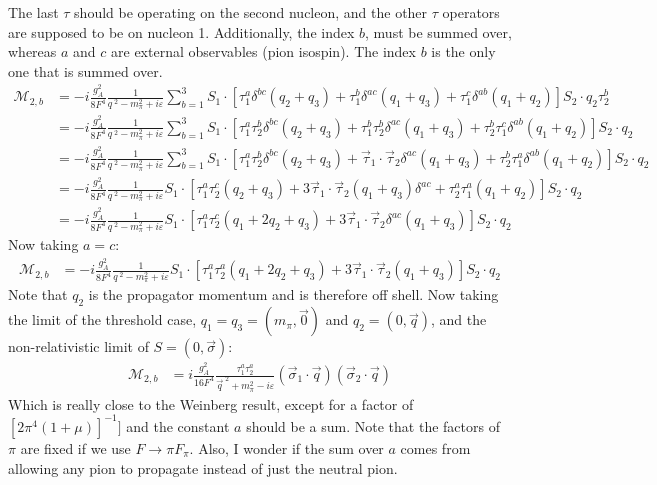 \documentclass[11pt]{article}
\newcommand\mm{\mathcal{M}}
\begin{document}
The last $\tau$ should be operating on the second nucleon, and the other $\tau$ operators are supposed to be on nucleon 1. Additionally, the index $b$, must be summed over, whereas $a$ and $c$ are external observables (pion isospin). The index $b$ is the only one that is summed over.
\begin{align}
\mm_{2,b}&=-i\frac{g_A^2}{8F^4}\frac{1}{q^{\;2}- m_\pi^2 + i \varepsilon} \sum_{b=1}^3 S_1 \cdot \left[ \tau_1^a \delta^{bc} (q_2+q_3) + \tau_1^b \delta^{ac} (q_1+q_3)+ \tau_1^c \delta^{ab} \left(q_1+q_2\right)\right] S_2 \cdot q_2 \tau^b_2\\
               &=-i\frac{g_A^2}{8F^4}\frac{1}{q^{\;2}- m_\pi^2 + i \varepsilon} \sum_{b=1}^3 S_1 \cdot \left[ \tau_1^a\tau_2^b \delta^{bc} (q_2+q_3) + \tau_1^b \tau_2^b\delta^{ac} (q_1+q_3)+ \tau_2^b\tau_1^c \delta^{ab} \left(q_1+q_2\right)\right] S_2 \cdot q_2\label{Correct}\\
               &=-i\frac{g_A^2}{8F^4}\frac{1}{q^{\;2}- m_\pi^2 + i \varepsilon} \sum_{b=1}^3 S_1 \cdot \left[ \tau_1^a\tau_2^b \delta^{bc} (q_2+q_3) + \vec{\tau}_1 \cdot \vec{\tau}_2 \delta^{ac}(q_1+q_3)+ \tau_2^b\tau_1^a \delta^{ab} \left(q_1+q_2\right)\right] S_2 \cdot q_2\\
    &=-i\frac{g_A^2}{8F^4}\frac{1}{q^{\;2}- m_\pi^2 + i \varepsilon} S_1 \cdot \left[ \tau_1^a\tau_2^c (q_2+q_3) +3\vec{\tau}_1 \cdot \vec{\tau}_2 (q_1+q_3)\delta^{ac}+ \tau_2^a\tau_1^a \left(q_1+q_2\right)\right] S_2 \cdot q_2\\
    &=-i\frac{g_A^2}{8F^4}\frac{1}{q^{\;2}- m_\pi^2 + i \varepsilon} S_1 \cdot \left[ \tau_1^a\tau_2^c (q_1+2q_2+q_3) +3\vec{\tau}_1 \cdot \vec{\tau}_2 \delta^{ac}(q_1+q_3)\right] S_2 \cdot q_2
\end{align}
Now taking $a=c$:
\begin{align}
 \mm_{2,b}&=-i\frac{g_A^2}{8F^4}\frac{1}{q^{\;2}- m_\pi^2 + i \varepsilon} S_1 \cdot \left[ \tau_1^a\tau_2^a (q_1+2q_2+q_3) +3\vec{\tau}_1 \cdot \vec{\tau}_2 (q_1+q_3)\right] S_2 \cdot q_2
\end{align}
Note that $q_2$ is the propagator momentum and is therefore off shell.
Now taking the limit of the threshold case, $q_1=q_3=(m_\pi, \vec{0})$ and $q_2=(0,\vec{q})$, and the non-relativistic limit of $S=(0,\vec{\sigma})$:
\begin{align}
    \mm_{2,b}&=i\frac{g_A^2}{16F^4}\frac{\tau_1^a\tau_2^a}{\vec{q}^{\;2}+ m_\pi^2 - i \varepsilon}\left(\vec{\sigma}_1 \cdot \vec{q} \right)\left(\vec{\sigma}_2 \cdot \vec{q}\right)
\end{align}
Which is really close to the Weinberg result, except for a factor of $\left[2\pi^4 \left( 1+\mu \right)\right]^{-1}]$ and the constant $a$ should be a sum. Note that the factors of $\pi$ are fixed if we use $F \to \pi F_\pi$.
Also, I wonder if the sum over $a$ comes from allowing any pion to propagate instead of just the neutral pion.
\end{document}
